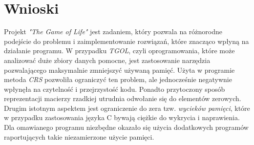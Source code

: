 \documentclass[11pt,a4paper]{report}
\begin{document}
\section{Wnioski}\label{sec:teskt}
Projekt \textsl{"The Game of Life"} jest zadaniem, który pozwala na różnorodne podejście do problemu i zaimplementowanie rozwiązań, które znacząco wpłyną na działanie programu. W przypadku \textsl{TGOL}, czyli oprogramowania, które może analizować duże zbiory danych pomocne, jest zastosowanie narzędzia pozwalającego maksymalnie zmniejszyć używaną pamięć. Użyta w programie metoda \textsl{CRS} pozwoliła ograniczyć ten problem, ale jednocześnie negatywnie wpłynęła na czytelność i przejrzystość kodu. Ponadto przytoczony sposób reprezentacji macierzy rzadkiej utrudnia odwołanie się do elementów zerowych. Drugim istotnym aspektem jest ograniczenie do zera tzw.  \textsl{wycieków pamięci}, które w przypadku zastosowania języka C bywają ciężkie do wykrycia i naprawienia. Dla omawianego programu niezbędne okazało się użycia dodatkowych programów raportujących takie niezamierzone użycie pamięci. 
\end{document}
